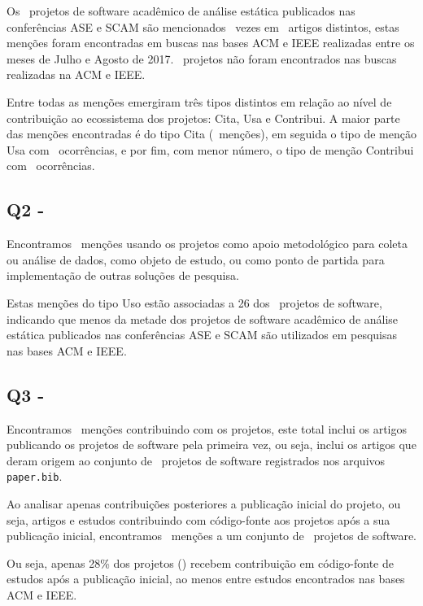 Os \SoftwareCount \ projetos de software acadêmico de análise estática
publicados nas conferências ASE e SCAM são mencionados \ScreeningCount \ vezes
em \ScreeningUniqueCount \ artigos distintos, estas menções foram encontradas
em buscas nas bases ACM e IEEE realizadas entre os meses de Julho e Agosto de
2017. \SoftwareNotFoundOnSearch \ projetos não foram encontrados nas buscas
realizadas na ACM e IEEE.

Entre todas as menções emergiram três tipos distintos em relação ao nível de
contribuição ao ecossistema dos projetos: Cita, Usa e Contribui. A maior parte
das menções encontradas é do tipo Cita (\CiteCount \ menções), em seguida
o tipo de menção Usa com \UseCount \ ocorrências, e por fim, com menor número,
o tipo de menção Contribui com \ContributeCount \ ocorrências.

\subsection{Q2 - \EstudoDoisQuestaoDois}

Encontramos \UseCount \ menções usando os projetos como apoio metodológico para
coleta ou análise de dados, como objeto de estudo, ou como ponto de partida
para implementação de outras soluções de pesquisa.

Estas menções do tipo Uso estão associadas a 26 dos \SoftwareCount \ projetos
de software, indicando que menos da metade dos projetos de software acadêmico
de análise estática publicados nas conferências ASE e SCAM são utilizados em
pesquisas nas bases ACM e IEEE.

\subsection{Q3 - \EstudoDoisQuestaoTres}

Encontramos \ContributeCount \ menções contribuindo com os projetos, este total
inclui os artigos publicando os projetos de software pela primeira vez, ou
seja, inclui os artigos que deram origem ao conjunto de \SoftwareCount \
projetos de software registrados nos arquivos \texttt{paper.bib}.

Ao analisar apenas contribuições posteriores a publicação inicial
do projeto, ou seja, artigos e estudos contribuindo com código-fonte
aos projetos após a sua publicação inicial, encontramos
\ContributeStudyDoisCount \ menções a um conjunto de
\ContributeStudyDoisSoftware \ projetos de software.

Ou seja, apenas 28\% dos projetos (\unskip)
recebem contribuição em código-fonte de estudos após a publicação inicial, ao
menos entre estudos encontrados nas bases ACM e IEEE.

